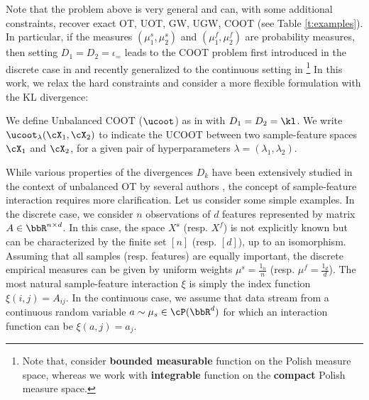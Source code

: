 Note that the problem above is very general and can, with some additional
constraints, recover exact OT, UOT, GW, UGW, COOT (see Table \ref{t:examples}).
In particular, if the measures $(\mu^s_1, \mu^s_2)$ and $(\mu^f_1, \mu^f_2)$
are probability measures, then setting $D_1 = D_2 = \iota_=$ leads to the
COOT problem first introduced in the discrete case in \citep{Redko20} and
recently generalized to the continuous setting in \citep{Chowdhury21b}
\footnote{Note that, \citep{Chowdhury21b} consider \textbf{bounded measurable} function
on the Polish measure space, whereas we work with \textbf{integrable} function
on the \textbf{compact} Polish measure space.}
In this work, we relax the hard constraints and consider a more flexible formulation
with the KL divergence:
\begin{definition}[UCOOT]
   We define Unbalanced COOT ($\ucoot$) as in  with $D_1 = D_2 = \kl$.
   We write $\ucoot_{\lambda}(\cX_1, \cX_2)$ to indicate the UCOOT between
   two sample-feature spaces $\cX_1$ and $\cX_2$, for a given
   pair of hyperparameters $\lambda = (\lambda_1, \lambda_2)$.
\end{definition}
While various properties of the divergences $D_k$ have been extensively studied
in the context of unbalanced OT by several authors \citep{Chizat17,Frogner15},
the concept of sample-feature interaction requires more clarification.
Let us consider some simple examples.
In the discrete case, we consider $n$ observations of $d$ features
represented by matrix $A \in \bbR^{n \times d}$. In this case, the space $X^s$ (resp. $X^f$)
is not explicitly known but can be characterized by the finite set $[n]$ (resp. $[d]$),
up to an isomorphism. Assuming that all samples (resp. features) are equally important,
the discrete empirical measures can be given by uniform weights $\mu^s = \frac{1_{n}}{n}$
(resp. $\mu^f = \frac{1_{d}}{d}$). The most natural sample-feature interaction $\xi$ is simply
the index function $\xi(i, j) = A_{ij}$. In the continuous case,
we assume that data stream from a continuous random variable $a \sim \mu_s \in \cP(\bbR^d)$
for which an interaction function can be $\xi(a, j) = a_j$.
